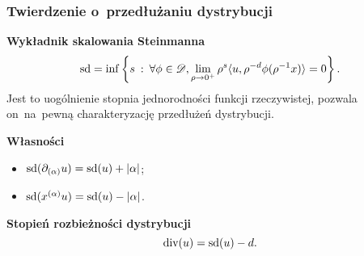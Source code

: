 \documentclass[10pt,t]{beamer}
\begin{document}
\begin{frame}
  \frametitle{Twierdzenie o~przedłużaniu dystrybucji}


  \textbf{Wykładnik skalowania Steinmanna}
  \begin{equation}
    \label{eq:Epstein-Glaser-03}
    \textrm{sd} =
    \inf \left\{ s \: : \: \forall \phi \in \mathcal{D},
      \lim_{ \rho \to 0^{ + } } \rho^{ s } \langle u, \rho^{ -d } \phi( \rho^{ -1 } x ) \rangle = 0 \right\}.
  \end{equation}
  Jest to uogólnienie stopnia jednorodności funkcji rzeczywistej,
  pozwala on~na~pewną charakteryzację przedłużeń dystrybucji.

  \vspace{\spaceFour}



  \textbf{Własności}
  \begin{itemize}

  \item $\textrm{sd}( \partial_{ ( \alpha ) } u ) = \textrm{sd}( u ) + | \alpha |$;

  \item $\textrm{sd}( x^{ ( \alpha ) } u ) = \textrm{sd}( u ) - | \alpha |$.

  \end{itemize}

  \vspace{\spaceFour}



  \textbf{Stopień rozbieżności dystrybucji} \\
  \begin{equation}
    \textrm{div}( u ) = \textrm{sd}( u ) - d.
  \end{equation}

\end{frame}
\end{document}
